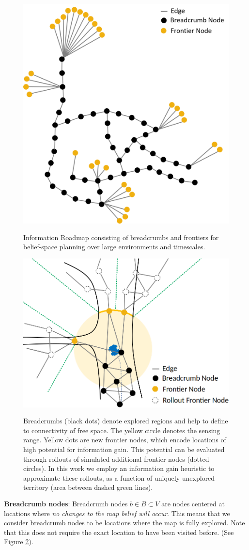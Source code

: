 \documentclass[letterpaper, 10 pt, conference]{ieeeconf}  %
\newcommand{\ph}[1]{{\textbf{#1}:}} %
\begin{document}
\begin{figure}[ht!]
  \includegraphics[width=.48\textwidth]{figures/irm.png}
  \label{fig:irm_large}
  \caption{Information Roadmap consisting of breadcrumbs and frontiers for belief-space planning over large environments and timescales.}
\end{figure}

\begin{figure}[ht!]
  \includegraphics[width=.48\textwidth]{figures/irm_breadcrumbs_frontiers.png}
  \label{fig:breadcrumbs_frontiers}
  \caption{Breadcrumbs (black dots) denote explored regions and help to define to connectivity of free space.  The yellow circle denotes the sensing range.  Yellow dots are new frontier nodes, which encode locations of high potential for information gain.  This potential can be evaluated through rollouts of simulated additional frontier nodes (dotted circles).  In this work we employ an information gain heuristic to approximate these rollouts, as a function of uniquely unexplored territory (area between dashed green lines).}
\end{figure}

\ph{Breadcrumb nodes}
Breadcrumb nodes $b\in B \subset V$ are nodes centered at locations where \textit{no changes to the map belief will occur}.  This means that we consider breadcrumb nodes to be locations where the map is fully explored.  Note that this does not require the exact location to have been visited before.  (See Figure \ref{fig:breadcrumbs_frontiers}). 
\end{document}
